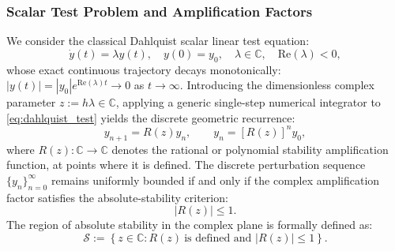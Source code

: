 \documentclass[11pt,a4paper]{article}
\theoremstyle{definition}
\theoremstyle{remark}
\begin{document}
\subsubsection{Scalar Test Problem and Amplification Factors}
We consider the classical Dahlquist scalar linear test equation:
\begin{equation}
\label{eq:dahlquist_test}
\dot{y}(t) = \lambda y(t), \quad y(0) = y_0, \quad \lambda \in \mathbb{C}, \quad \mathrm{Re}(\lambda) < 0,
\end{equation}
whose exact continuous trajectory decays monotonically: $|y(t)| = |y_0| e^{\mathrm{Re}(\lambda)t} \to 0$ as $t \to \infty$. Introducing the dimensionless complex parameter $z := h\lambda \in \mathbb{C}$, applying a generic single-step numerical integrator to \eqref{eq:dahlquist_test} yields the discrete geometric recurrence:
\begin{equation}
\label{eq:discrete_recurrence}
 y_{n+1} = R(z) y_n, \qquad y_n = \left[R(z)\right]^n y_0,
\end{equation}
where $R(z): \mathbb{C} \to \mathbb{C}$ denotes the rational or polynomial stability amplification function, at points where it is defined. The discrete perturbation sequence $\{y_n\}_{n=0}^\infty$ remains uniformly bounded if and only if the complex amplification factor satisfies the absolute-stability criterion:
\begin{equation}
\label{eq:stability_criterion}
|R(z)| \le 1.
\end{equation}
The region of absolute stability in the complex plane is formally defined as:
\begin{equation}
\label{eq:stability_region_def}
\mathcal{S} := \left\{ z \in \mathbb{C} : R(z)\ \text{is defined and } |R(z)| \le 1 \right\}.
\end{equation}
\end{document}
